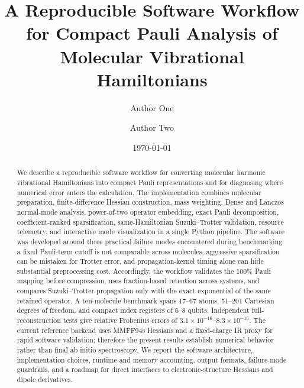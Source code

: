 \documentclass[aip,jcp,reprint,amsmath,amssymb,floatfix]{revtex4-2}
\begin{document}
\title{A Reproducible Software Workflow for Compact Pauli Analysis of Molecular Vibrational Hamiltonians}

\author{Author One}
\author{Author Two}

\date{\today}

\begin{abstract}
We describe a reproducible software workflow for converting molecular harmonic vibrational Hamiltonians into compact Pauli representations and for diagnosing where numerical error enters the calculation. The implementation combines molecular preparation, finite-difference Hessian construction, mass weighting, Dense and Lanczos normal-mode analysis, power-of-two operator embedding, exact Pauli decomposition, coefficient-ranked sparsification, same-Hamiltonian Suzuki--Trotter validation, resource telemetry, and interactive mode visualization in a single Python pipeline. The software was developed around three practical failure modes encountered during benchmarking: a fixed Pauli-term cutoff is not comparable across molecules, aggressive sparsification can be mistaken for Trotter error, and propagation-kernel timing alone can hide substantial preprocessing cost. Accordingly, the workflow validates the 100\% Pauli mapping before compression, uses fraction-based retention across systems, and compares Suzuki--Trotter propagation only with the exact exponential of the same retained operator. A ten-molecule benchmark spans 17--67 atoms, 51--201 Cartesian degrees of freedom, and compact index registers of 6--8 qubits. Independent full-reconstruction tests give relative Frobenius errors of $3.1\times10^{-16}$--$8.3\times10^{-16}$. The current reference backend uses MMFF94s Hessians and a fixed-charge IR proxy for rapid software validation; therefore the present results establish numerical behavior rather than final ab initio spectroscopy. We report the software architecture, implementation choices, runtime and memory accounting, output formats, failure-mode guardrails, and a roadmap for direct interfaces to electronic-structure Hessians and dipole derivatives.\end{abstract}

\maketitle
\end{document}
